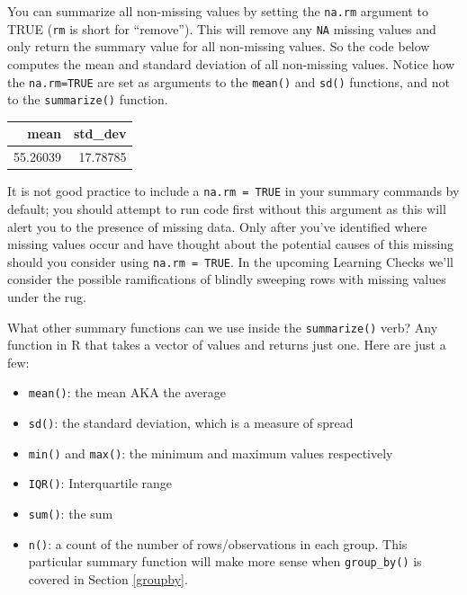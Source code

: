 \documentclass[12pt,]{krantz}
\makeatletter
\newenvironment{Shaded}{\begin{snugshade}}{\end{snugshade}}
\newcommand{\KeywordTok}[1]{\textcolor[rgb]{0.27,0.27,0.27}{\textbf{#1}}}
\newcommand{\DataTypeTok}[1]{\textcolor[rgb]{0.27,0.27,0.27}{#1}}
\newcommand{\StringTok}[1]{\textcolor[rgb]{0.5,0.5,0.5}{#1}}
\newcommand{\OtherTok}[1]{\textcolor[rgb]{0.37,0.37,0.37}{#1}}
\newcommand{\OperatorTok}[1]{\textcolor[rgb]{0.43,0.43,0.43}{\textbf{#1}}}
\newcommand{\NormalTok}[1]{#1}
\providecommand{\tightlist}{%
  \setlength{\itemsep}{0pt}\setlength{\parskip}{0pt}}
\newenvironment{kframe}{%
\medskip{}
\setlength{\fboxsep}{.8em}
 \def\at@end@of@kframe{}%
 \ifinner\ifhmode%
  \def\at@end@of@kframe{\end{minipage}}%
  \begin{minipage}{\columnwidth}%
 \fi\fi%
 \def\FrameCommand##1{\hskip\@totalleftmargin \hskip-\fboxsep
 \colorbox{shadecolor}{##1}\hskip-\fboxsep
     \hskip-\linewidth \hskip-\@totalleftmargin \hskip\columnwidth}%
 \MakeFramed {\advance\hsize-\width
   \@totalleftmargin\z@ \linewidth\hsize
   \@setminipage}}%
 {\par\unskip\endMakeFramed%
 \at@end@of@kframe}
\renewenvironment{Shaded}{\begin{kframe}}{\end{kframe}}
\theoremstyle{definition}
\theoremstyle{definition}
\theoremstyle{definition}
\theoremstyle{remark}
\makeatother
\begin{document}
You can summarize all non-missing values by setting the \texttt{na.rm}
argument to TRUE (\texttt{rm} is short for ``remove''). This will remove
any \texttt{NA} missing values and only return the summary value for all
non-missing values. So the code below computes the mean and standard
deviation of all non-missing values. Notice how the \texttt{na.rm=TRUE}
are set as arguments to the \texttt{mean()} and \texttt{sd()} functions,
and not to the \texttt{summarize()} function.

\begin{Shaded}
\end{Shaded}

\begin{table}[H]
\centering\begingroup\fontsize{10}{12}\selectfont

\begin{tabular}{r|r}
\hline
mean & std\_dev\\
\hline
55.26039 & 17.78785\\
\hline
\end{tabular}\endgroup{}
\end{table}

It is not good practice to include a \texttt{na.rm\ =\ TRUE} in your
summary commands by default; you should attempt to run code first
without this argument as this will alert you to the presence of missing
data. Only after you've identified where missing values occur and have
thought about the potential causes of this missing should you consider
using \texttt{na.rm\ =\ TRUE}. In the upcoming Learning Checks we'll
consider the possible ramifications of blindly sweeping rows with
missing values under the rug.

What other summary functions can we use inside the \texttt{summarize()}
verb? Any function in R that takes a vector of values and returns just
one. Here are just a few:

\begin{itemize}
\tightlist
\item
  \texttt{mean()}: the mean AKA the average
\item
  \texttt{sd()}: the standard deviation, which is a measure of spread
\item
  \texttt{min()} and \texttt{max()}: the minimum and maximum values
  respectively
\item
  \texttt{IQR()}: Interquartile range
\item
  \texttt{sum()}: the sum
\item
  \texttt{n()}: a count of the number of rows/observations in each
  group. This particular summary function will make more sense when
  \texttt{group\_by()} is covered in Section \ref{groupby}.
\end{itemize}
\end{document}
